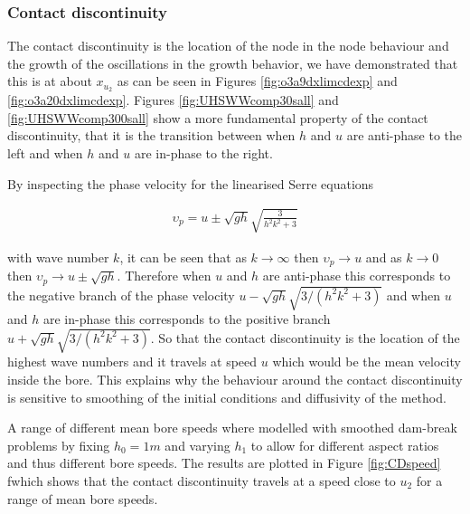 \documentclass[times]{elsarticle}
\begin{document}
\subsubsection{Contact discontinuity}
The contact discontinuity is the location of the node in the node behaviour \cite{El-etal-2006} and the growth of the oscillations in the growth behavior, we have demonstrated that this is at about $x_{u_2}$ as can be seen in Figures \ref{fig:o3a9dxlimcdexp} and \ref{fig:o3a20dxlimcdexp}. Figures \ref{fig:UHSWWcomp30sall} and \ref{fig:UHSWWcomp300sall} show a more fundamental property of the contact discontinuity, that it is the transition between when $h$ and $u$ are anti-phase to the left and when $h$ and $u$ are in-phase to the right.

By inspecting the phase velocity for the linearised Serre equations
\begin{linenomath*}
		\begin{gather}
		\upsilon_p = u \pm \sqrt{gh} \sqrt{\frac{3}{h^2 k^2 + 3}}
		\end{gather}
\end{linenomath*}
with wave number $k$, it can be seen that as $k \rightarrow \infty$ then $\upsilon_p \rightarrow u$ and as $k \rightarrow 0$ then $\upsilon_p \rightarrow u \pm \sqrt{gh}$. Therefore when $u$ and $h$ are anti-phase this corresponds to the negative branch of the phase velocity $u - \sqrt{gh} \sqrt{{3}/\left({h^2 k^2 + 3}\right)}$ and when $u$ and $h$ are in-phase this corresponds to the positive branch  $u + \sqrt{gh} \sqrt{{3}/\left({h^2 k^2 + 3}\right)}$. So that the contact discontinuity is the location of the highest wave numbers and it travels at speed $u$ which would be the mean velocity inside the bore. This explains why the behaviour around the contact discontinuity is sensitive to smoothing of the initial conditions and diffusivity of the method.

A range of different mean bore speeds where modelled with smoothed dam-break problems by fixing $h_0=1m$ and varying $h_1$ to allow for different aspect ratios and thus different bore speeds. The results are plotted in Figure \ref{fig:CDspeed} fwhich shows that the contact discontinuity travels at a speed close to $u_2$ for a range of mean bore speeds. 
\end{document}
